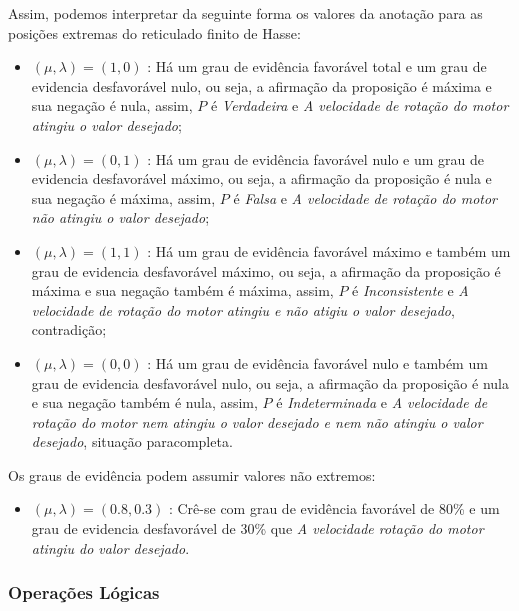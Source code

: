 Assim, podemos interpretar da seguinte forma os valores da anotação para as posições extremas do reticulado finito de Hasse:

\begin{itemize}
\item 
$(\mu, \lambda ) = (1,0)$ : Há um grau de evidência favorável total e um grau de evidencia desfavorável nulo, ou seja, a afirmação da proposição é máxima e sua negação é nula, assim,  $P$ é \emph{Verdadeira} e \emph{A velocidade de rotação do motor atingiu o valor desejado};

\item 
$(\mu, \lambda ) = (0,1)$ : Há um grau de evidência favorável nulo e um grau de evidencia desfavorável máximo, ou seja, a afirmação da proposição é nula e sua negação é máxima, assim,  $P$ é \emph{Falsa} e \emph{A velocidade de rotação do motor não atingiu o valor desejado};

\item 
$(\mu, \lambda ) = (1,1)$ : Há um grau de evidência favorável máximo e também um grau de evidencia desfavorável máximo, ou seja, a afirmação da proposição é máxima e sua negação também é máxima, assim,  $P$ é \emph{Inconsistente} e \emph{A velocidade de rotação do motor atingiu e não atigiu o valor desejado}, contradição;

\item 
$(\mu, \lambda ) = (0,0)$ : Há um grau de evidência favorável nulo e também um grau de evidencia desfavorável nulo, ou seja, a afirmação da proposição é nula e sua negação também é nula, assim,  $P$ é \emph{Indeterminada} e \emph{A velocidade de rotação do motor nem atingiu o valor desejado e nem não atingiu o valor desejado}, situação paracompleta.

\end{itemize}

Os graus de evidência podem assumir valores não extremos:

\begin{itemize}
\item 
$(\mu, \lambda ) = (0.8,0.3)$ : Crê-se com grau de evidência favorável de 80\% e um grau de evidencia desfavorável de 30\%  que \emph{A velocidade rotação do motor atingiu do valor desejado}.
\end{itemize}

\subsubsection{Operações Lógicas}

